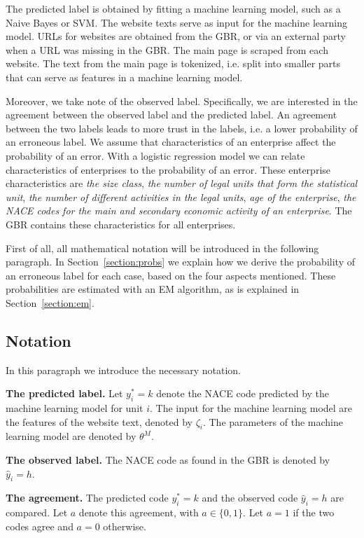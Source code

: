 \documentclass[12pt, a4paper, titlepage]{article}
\begin{document}
The predicted label is obtained by fitting a machine learning model, such as a Naive Bayes or SVM. The website texts serve as input for the machine learning model. URLs for websites are obtained from the GBR, or via an external party when a URL was missing in the GBR. The main page is scraped from each website. The text from the main page is tokenized, i.e. split into smaller parts that can serve as features in a machine learning model. 

Moreover, we take note of the observed label. Specifically, we are interested in the agreement between the observed label and the predicted label. An agreement between the two labels leads to more trust in the labels, i.e. a lower probability of an erroneous label. 
We assume that characteristics of an enterprise affect the probability of an error. With a logistic regression model we can relate characteristics of enterprises to the probability of an error. These enterprise characteristics are \textit{the size class}, \textit{the number of legal units that form the statistical unit}, \textit{the number of different activities in the legal units}, \textit{age of the enterprise}, \textit{the NACE codes for the main and secondary economic activity of an enterprise}. The GBR contains these characteristics for all enterprises.
\bigskip

First of all, all mathematical notation will be introduced in the following paragraph. In Section~\ref{section:probs} we explain how we derive the probability of an erroneous label for each case, based on the four aspects mentioned. These probabilities are estimated with an EM algorithm, as is explained in Section~\ref{section:em}.

							\subsection{Notation}
In this paragraph we introduce the necessary notation.

\textbf{The predicted label.} Let $y^*_i = k$ denote the NACE code predicted by the machine learning model for unit $i$. The input for the machine learning model are the features of the website text, denoted by $\zeta_i$. The parameters of the machine learning model are denoted by $\theta^M$. 

\textbf{The observed label.} The NACE code as found in the GBR is denoted by $\hat{y}_i = h$. 

\textbf{The agreement.} The predicted code $y^*_i = k$ and the observed code  $\hat{y}_i = h$ are compared. Let $a$ denote this agreement, with $a \in \{0,1\}$. Let $a=1$ if the two codes agree and $a=0$ otherwise.
\end{document}

